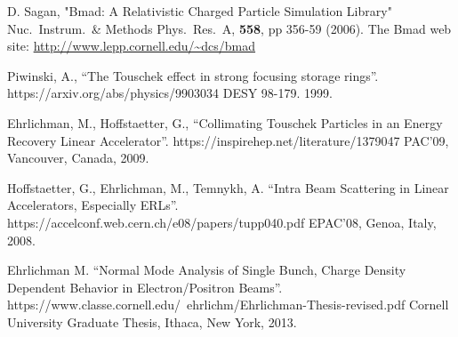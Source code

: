 \documentclass[11pt]{article}
\begin{document}

\begin{thebibliography}{9}

D. Sagan,
"Bmad: A Relativistic Charged Particle Simulation Library"
Nuc.\ Instrum.\ \& Methods Phys.\ Res.\ A, {\bf 558}, pp 356-59 (2006).
The Bmad web site:
\hfill\break
\hspace*{0.3in} \url{http://www.lepp.cornell.edu/~dcs/bmad}

Piwinski, A., ``The Touschek effect in strong focusing storage rings''.
https://arxiv.org/abs/physics/9903034
DESY 98-179.  1999.

Ehrlichman, M., Hoffstaetter, G.,
``Collimating Touschek Particles in an Energy Recovery Linear Accelerator''.
https://inspirehep.net/literature/1379047
PAC'09, Vancouver, Canada, 2009.

Hoffstaetter, G., Ehrlichman, M., Temnykh, A.
``Intra Beam Scattering in Linear Accelerators, Especially ERLs''.
https://accelconf.web.cern.ch/e08/papers/tupp040.pdf
EPAC'08, Genoa, Italy, 2008.

Ehrlichman M.
``Normal Mode Analysis of Single Bunch, Charge Density Dependent Behavior in 
Electron/Positron Beams''.
https://www.classe.cornell.edu/~ehrlichm/Ehrlichman-Thesis-revised.pdf
Cornell University Graduate Thesis, Ithaca, New York, 2013.

\end{thebibliography}
\end{document}
